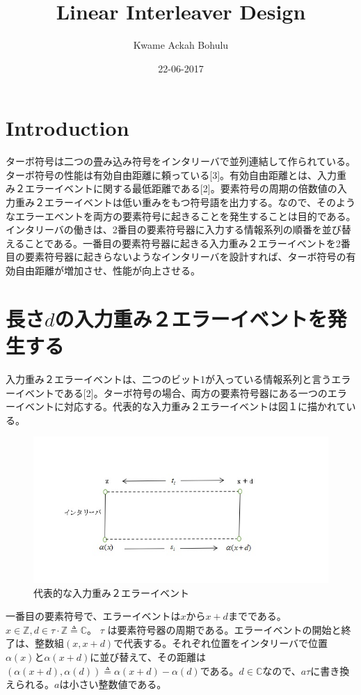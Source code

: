\documentclass[20 pts]{article}
\title{Linear Interleaver Design}
\author{Kwame Ackah Bohulu}
\date{22-06-2017}
\begin{document}
\maketitle


\section{Introduction}
ターボ符号は二つの畳み込み符号をインタリーバで並列連結して作られている。ターボ符号の性能は有効自由距離に頼っている[3]。有効自由距離とは、入力重み２エラーイベントに関する最低距離である[2]。要素符号の周期の倍数値の入力重み２エラーイベントは低い重みをもつ符号語を出力する。なので、そのようなエラーエベントを両方の要素符号に起きることを発生することは目的である。インタリーバの働きは、2番目の要素符号器に入力する情報系列の順番を並び替えることである。一番目の要素符号器に起きる入力重み２エラーイベントを2番目の要素符号器に起きらないようなインタリーバを設計すれば、ターボ符号の有効自由距離が増加させ、性能が向上させる。


\section{長さ$d$の入力重み２エラーイベントを発生する}
入力重み２エラーイベントは、二つのビット1が入っている情報系列と言うエラーイベントである[2]。ターボ符号の場合、両方の要素符号器にある一つのエラーイベントに対応する。代表的な入力重み２エラーイベントは図１に描かれている。

\begin{figure}[h!]
\includegraphics[width=\textwidth]{weight2error.jpg}
\caption{代表的な入力重み２エラーイベント}
\label{}
\end{figure}
一番目の要素符号で、エラーイベントは$x$から$x+d$までである。$x \in \mathbb{Z},d \in \tau \cdot \mathbb{Z} \triangleq \mathbb{C}$。  $\tau$ は要素符号器の周期である。エラーイベントの開始と終了は、整数組$(x,x+d)$で代表する。それぞれ位置をインタリーバで位置$\alpha(x)$と$\alpha(x+d)$に並び替えて、その距離は $(\alpha(x+d),\alpha(d)) \triangleq \alpha(x+d) - \alpha(d) $である。$d \in \mathbb{C}$なので、$a\tau$に書き換えられる。$a$は小さい整数値である。
 
\end{document}

